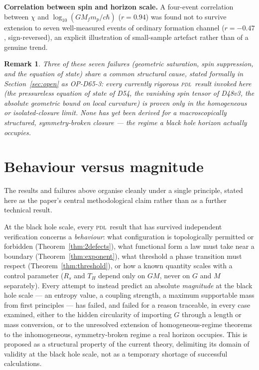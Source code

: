 \documentclass[12pt,a4paper]{article}
\newtheorem{remark}[theorem]{Remark}
\newcommand{\hb}{\hbar}
\newcommand{\PDL}{\textsc{pdl}}
\newcommand{\chif}{\chi}
\begin{document}
\begin{negativebox}
\textbf{Correlation between spin and horizon scale.} A four-event
correlation between $\chif$ and $\log_{10}(GM_f m_p/c\hb)$
($r=0.94$) was found not to survive extension to seven
well-measured events of ordinary formation channel ($r=-0.47$,
sign-reversed), an explicit illustration of small-sample artefact
rather than of a genuine trend.
\end{negativebox}

\begin{remark}
Three of these seven failures (geometric saturation, spin
suppression, and the equation of state) share a common structural
cause, stated formally in Section~\ref{sec:open} as OP-D65-3: every
currently rigorous \PDL\ result invoked here (the pressureless
equation of state of D54, the vanishing spin tensor of D48v3, the
absolute geometric bound on local curvature) is proven only in the
homogeneous or isolated-closure limit. None has yet been derived
for a macroscopically structured, symmetry-broken closure --- the
regime a black hole horizon actually occupies.
\end{remark}

\section{Behaviour versus magnitude}
\label{sec:principle}

The results and failures above organise cleanly under a single
principle, stated here as the paper's central methodological claim
rather than as a further technical result.

\begin{conjecturebox}[title=Behaviour-versus-magnitude principle]
At the black hole scale, every \PDL\ result that has survived
independent verification concerns a \emph{behaviour}: what
configuration is topologically permitted or forbidden
(Theorem~\ref{thm:2defects}), what functional form a law must take
near a boundary (Theorem~\ref{thm:exponent}), what threshold a
phase transition must respect (Theorem~\ref{thm:threshold}), or how
a known quantity scales with a control parameter
($R_s$ and $T_H$ depend only on $GM$, never on $G$ and $M$
separately). Every attempt to instead predict an absolute
\emph{magnitude} at the black hole scale --- an entropy value, a
coupling strength, a maximum supportable mass from first principles
--- has failed, and failed for a reason traceable, in every case
examined, either to the hidden circularity of importing $G$ through
a length or mass conversion, or to the unresolved extension of
homogeneous-regime theorems to the inhomogeneous, symmetry-broken
regime a real horizon occupies. This is proposed as a structural
property of the current theory, delimiting its domain of validity
at the black hole scale, not as a temporary shortage of successful
calculations.
\end{conjecturebox}
\end{document}
